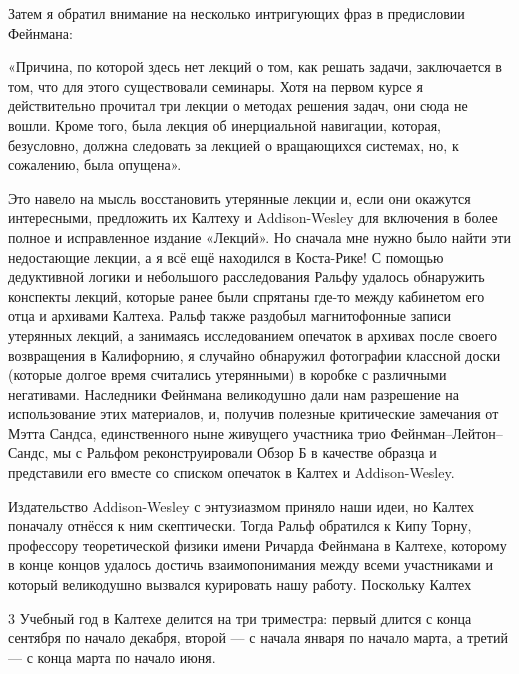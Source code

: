 \documentclass[11pt,oneside]{article}
\newcommand{\TipsRunning}[1]{\par\vspace{2bp}{\centering\footnotesize #1\par}\vspace{2bp}}
\begin{document}
Затем я обратил внимание на несколько интригующих фраз в предисловии Фейнмана:\par



«Причина, по которой здесь нет лекций о том, как решать задачи, заключается в том, что для этого существовали семинары. Хотя на первом курсе я действительно прочитал три лекции о методах решения задач, они сюда не вошли. Кроме того, была лекция об инерциальной навигации, которая, безусловно, должна следовать за лекцией о вращающихся системах, но, к сожалению, была опущена».\par



Это навело на мысль восстановить утерянные лекции и, если они окажутся интересными, предложить их Калтеху и Addison-Wesley для включения в более полное и исправленное издание «Лекций». Но сначала мне нужно было найти эти недостающие лекции, а я всё ещё находился в Коста-Рике! С помощью дедуктивной логики и небольшого расследования Ральфу удалось обнаружить конспекты лекций, которые ранее были спрятаны где-то между кабинетом его отца и архивами Калтеха. Ральф также раздобыл магнитофонные записи утерянных лекций, а занимаясь исследованием опечаток в архивах после своего возвращения в Калифорнию, я случайно обнаружил фотографии классной доски (которые долгое время считались утерянными) в коробке с различными негативами. Наследники Фейнмана великодушно дали нам разрешение на использование этих материалов, и, получив полезные критические замечания от Мэтта Сандса, единственного ныне живущего участника трио Фейнман–Лейтон–Сандс, мы с Ральфом реконструировали Обзор Б в качестве образца и представили его вместе со списком опечаток в Калтех и Addison-Wesley.\par



Издательство Addison-Wesley с энтузиазмом приняло наши идеи, но Калтех поначалу отнёсся к ним скептически. Тогда Ральф обратился к Кипу Торну, профессору теоретической физики имени Ричарда Фейнмана в Калтехе, которому в конце концов удалось достичь взаимопонимания между всеми участниками и который великодушно вызвался курировать нашу работу. Поскольку Калтех\par



\TipsRunning{В В Е Д Е Н И Е • x i i i}



3 Учебный год в Калтехе делится на три триместра: первый длится с конца сентября по начало декабря, второй --- с начала января по начало марта, а третий --- с конца марта по начало июня.\par
\end{document}
